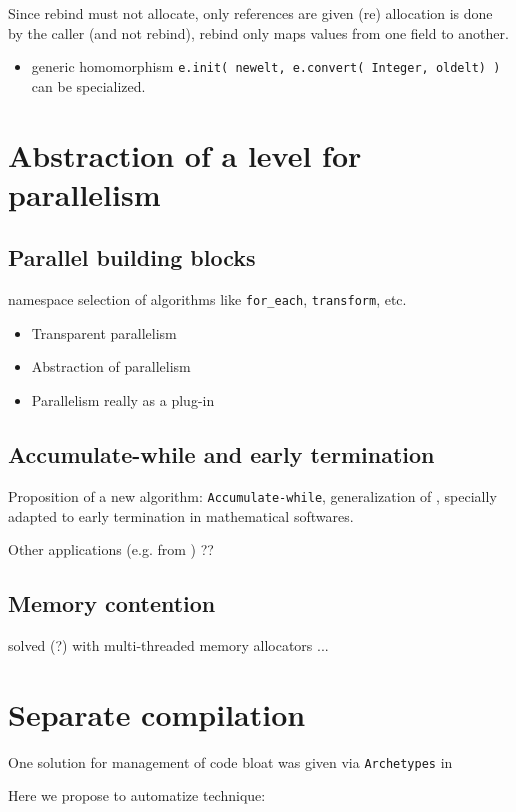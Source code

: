 \documentclass[runningheads,a4paper]{llncs}
\begin{document}
Since rebind must not allocate, only references are given (re)
allocation is done by the caller (and not rebind), rebind only maps
values from one field to another.

\begin{itemize}
\item generic homomorphism 
\verb!e.init( newelt, e.convert( Integer, oldelt) )!
can be specialized.
\end{itemize}

\section{Abstraction of a level for parallelism}
\subsection{Parallel building blocks}

namespace selection of algorithms like \verb!for_each!,
\verb!transform!, etc. 

\begin{itemize}
\item Transparent parallelism
\item Abstraction of parallelism
\item Parallelism really as a plug-in
\end{itemize}

\subsection{Accumulate-while and early termination}
Proposition of a new algorithm:
\verb!Accumulate-while!, generalization of \cite{jgd:2010:crt},
specially adapted to early termination in mathematical softwares.

Other applications (e.g. from \cite{Beaumont:2004:PMAA}) ??


\subsection{Memory contention}
solved (?) with multi-threaded memory allocators ...

\section{Separate compilation}
One solution for management of code bloat was given via
\verb!Archetypes! in \cite[\S 2.1]{jgd:2002:icms}

Here we propose to automatize \cite{Erlingsson:1996:issac} technique:
\end{document}
